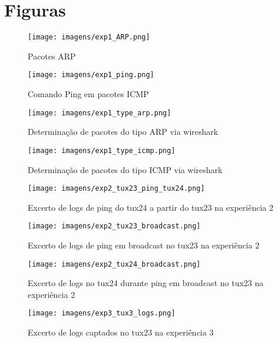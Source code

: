 \section{Figuras}

\begin{figure}[h!]
\centering
\texttt{[image: imagens/exp1\_ARP.png]}
\caption{Pacotes ARP}
\label{fig:arp_packets}
\end{figure}

\begin{figure}[h!]
\centering
\texttt{[image: imagens/exp1\_ping.png]}
\caption{Comando Ping em pacotes ICMP}
\label{fig:icmp_packets}
\end{figure}

\begin{figure}[h!]
\centering
\texttt{[image: imagens/exp1\_type\_arp.png]}
\caption{Determinação de pacotes do tipo ARP via wireshark}
\label{fig:arp_wireshark}
\end{figure}

\begin{figure}[h!]
\centering
\texttt{[image: imagens/exp1\_type\_icmp.png]}
\caption{Determinação de pacotes do tipo ICMP via wireshark}
\label{fig:icmp_wireshark}
\end{figure}

\begin{figure}[h!]
\centering
\texttt{[image: imagens/exp2\_tux23\_ping\_tux24.png]}
\caption{Excerto de logs de ping do tux24 a partir do tux23 na experiência 2}
\label{fig:exp2_tux23_ping_tux24}
\end{figure}

\begin{figure}[h!]
\centering
\texttt{[image: imagens/exp2\_tux23\_broadcast.png]}
\caption{Excerto de logs de ping em broadcast no tux23 na experiência 2}
\label{fig:exp2_tux23_broadcast}
\end{figure}

\begin{figure}[h!]
\centering
\texttt{[image: imagens/exp2\_tux24\_broadcast.png]}
\caption{Excerto de logs no tux24 durante ping em broadcast no tux23 na experiência 2}
\label{fig:exp2_tux24_broadcast}
\end{figure}

\begin{figure}[h!]
\centering
\texttt{[image: imagens/exp3\_tux3\_logs.png]}
\caption{Excerto de logs captados no tux23 na experiência 3}
\label{fig:exp3_tux3_logs}
\end{figure}

